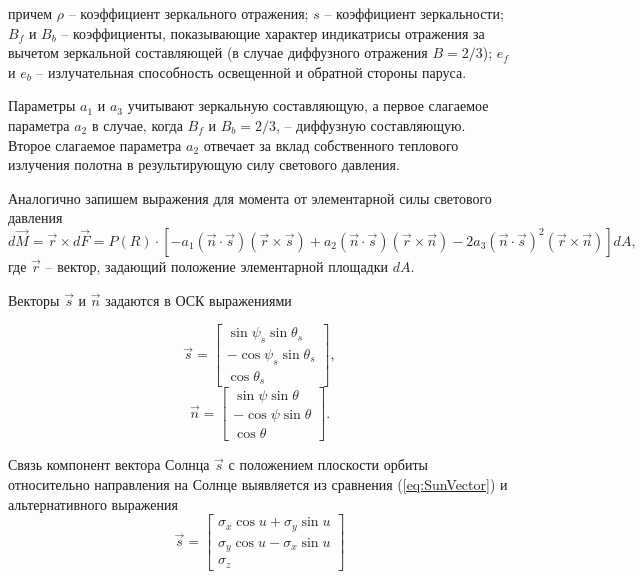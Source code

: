 причем $\rho$ -- коэффициент зеркального отражения; $s$ -- коэффициент зеркальности;
$B_f$ и $B_b$ -- коэффициенты, показывающие характер индикатрисы отражения за вычетом
зеркальной составляющей (в случае диффузного отражения $B = 2/3$); $e_f$ и $e_b$ --
излучательная способность освещенной и обратной стороны паруса.\par
  Параметры $a_{1}$ и $a_{3}$ учитывают зеркальную составляющую, а первое слагаемое
параметра $a_{2}$ в случае, когда $B_f$ и $B_b = 2/3$, -- диффузную составляющую.
Второе слагаемое параметра $a_{2}$ отвечает за вклад собственного теплового излучения
полотна в результирующую силу светового давления.\par
  Аналогично запишем выражения для момента от элементарной силы светового давления
\begin{equation}
  d\vec{M} = \vec{r} \times d\vec{F} = P(R) \cdot \left[
    -a_{1}(\vec{n}\cdot\vec{s})(\vec{r} \times \vec{s})
    +a_{2}(\vec{n}\cdot\vec{s})(\vec{r} \times \vec{n})
    -2a_{3}(\vec{n}\cdot\vec{s})^2(\vec{r} \times \vec{n})
  \right]dA,
\end{equation}
где $\vec{r}$ -- вектор, задающий положение элементарной площадки $dA$.\par
  Векторы $\vec{s}$ и $\vec{n}$ задаются в ОСК выражениями\par
\begin{equation} \label{eq:SunVector}
  \vec{s} = \begin{bmatrix}
     \sin\psi_s\sin\theta_s \\
    -\cos\psi_s\sin\theta_s \\
     \cos\theta_s
  \end{bmatrix},
\end{equation}
\begin{equation}
  \vec{n} = \begin{bmatrix}
     \sin\psi\sin\theta \\
    -\cos\psi\sin\theta \\
     \cos\theta
  \end{bmatrix}.
\end{equation}\par
Связь компонент вектора Солнца $\vec{s}$ с положением плоскости орбиты относительно
направления на Солнце выявляется из сравнения (\ref{eq:SunVector}) и альтернативного
выражения
\begin{equation}
  \vec{s} = \begin{bmatrix}
    \sigma_x\cos u + \sigma_y\sin u \\
    \sigma_y\cos u - \sigma_x\sin u \\
    \sigma_z
  \end{bmatrix}
\end{equation}

